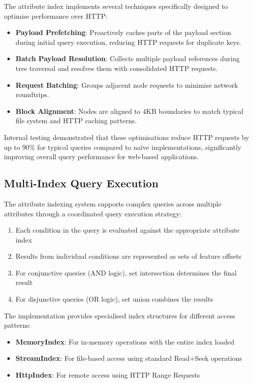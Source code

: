 The attribute index implements several techniques specifically designed to optimise performance over HTTP:

\begin{itemize}
    \item \textbf{Payload Prefetching}: Proactively caches parts of the payload section during initial query execution, reducing HTTP requests for duplicate keys.
    \item \textbf{Batch Payload Resolution}: Collects multiple payload references during tree traversal and resolves them with consolidated HTTP requests.
    \item \textbf{Request Batching}: Groups adjacent node requests to minimise network roundtrips.
    \item \textbf{Block Alignment}: Nodes are aligned to 4KB boundaries to match typical file system and HTTP caching patterns.
\end{itemize}

Internal testing demonstrated that these optimisations reduce HTTP requests by up to 90\% for typical queries compared to naïve implementations, significantly improving overall query performance for web-based applications.

\subsection{Multi-Index Query Execution}
\label{subsec:multi_index_query}

The attribute indexing system supports complex queries across multiple attributes through a coordinated query execution strategy:

\begin{enumerate}
    \item Each condition in the query is evaluated against the appropriate attribute index
    \item Results from individual conditions are represented as sets of feature offsets
    \item For conjunctive queries (AND logic), set intersection determines the final result
    \item For disjunctive queries (OR logic), set union combines the results
\end{enumerate}

The implementation provides specialised index structures for different access patterns:

\begin{itemize}
    \item \textbf{MemoryIndex}: For in-memory operations with the entire index loaded
    \item \textbf{StreamIndex}: For file-based access using standard Read+Seek operations
    \item \textbf{HttpIndex}: For remote access using HTTP Range Requests
\end{itemize}

